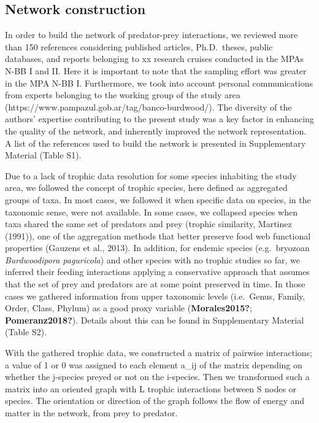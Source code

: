 \documentclass[preprint, 3p,
authoryear]{elsarticle} %
\begin{document}
\hypertarget{network-construction}{%
\subsection{Network construction}\label{network-construction}}

In order to build the network of predator-prey interactions, we reviewed
more than 150 references considering published articles, Ph.D.~theses,
public databases, and reports belonging to xx research cruises conducted
in the MPAs N-BB I and II. Here it is important to note that the
sampling effort was greater in the MPA N-BB I. Furthermore, we took into
account personal communications from experts belonging to the working
group of the study area
(https://www.pampazul.gob.ar/tag/banco-burdwood/). The diversity of the
authors' expertise contributing to the present study was a key factor in
enhancing the quality of the network, and inherently improved the
network representation. A list of the references used to build the
network is presented in Supplementary Material (Table S1).

Due to a lack of trophic data resolution for some species inhabiting the
study area, we followed the concept of trophic species, here defined as
aggregated groups of taxa. In most cases, we followed it when specific
data on species, in the taxonomic sense, were not available. In some
cases, we collapsed species when taxa shared the same set of predators
and prey (trophic similarity, Martinez (1991)), one of the aggregation
methods that better preserve food web functional properties (Gauzens et
al., 2013). In addition, for endemic species (e.g.~bryozoan
\emph{Burdwoodipora paguricola}) and other species with no trophic
studies so far, we inferred their feeding interactions applying a
conservative approach that assumes that the set of prey and predators
are at some point preserved in time. In those cases we gathered
information from upper taxonomic levels (i.e.~Genus, Family, Order,
Class, Phylum) as a good proxy variable (\textbf{Morales2015?};
\textbf{Pomeranz2018?}). Details about this can be found in
Supplementary Material (Table S2).

With the gathered trophic data, we constructed a matrix of pairwise
interactions; a value of 1 or 0 was assigned to each element a\_ij of
the matrix depending on whether the j-species preyed or not on the
i-species. Then we transformed such a matrix into an oriented graph with
L trophic interactions between S nodes or species. The orientation or
direction of the graph follows the flow of energy and matter in the
network, from prey to predator.
\end{document}
